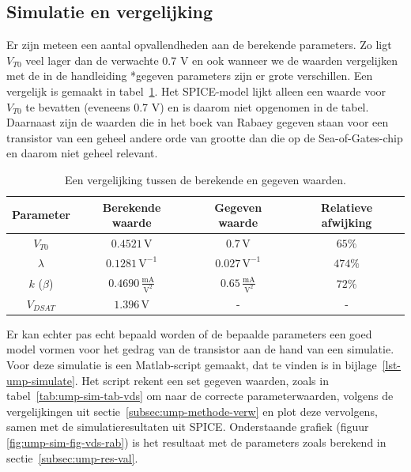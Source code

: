 \documentclass{scrartcl}
\begin{document}
\subsection{Simulatie en vergelijking}
\label{sec:ump-res-verg}
Er zijn meteen een aantal opvallendheden aan de berekende parameters. Zo ligt $V_{T0}$ veel lager dan de verwachte 0.7 V en ook wanneer we de waarden vergelijken met de in de handleiding *gegeven parameters zijn er grote verschillen. Een vergelijk is gemaakt in tabel~\ref{tab:ump-par-comp}. Het SPICE-model lijkt alleen een waarde voor $V_{T0}$ te bevatten (eveneens 0.7 V) en is daarom niet opgenomen in de tabel. Daarnaast zijn de waarden die in het boek van Rabaey gegeven staan voor een transistor van een geheel andere orde van grootte dan die op de Sea-of-Gates-chip en daarom niet geheel relevant. \cite[103]{rabaey-integrated-circuits}

\begin{table}[H]
	\centering
	\caption{Een vergelijking tussen de berekende en gegeven waarden. \cite[98]{epo3-manual}}
	\label{tab:ump-par-comp}
	\begin{tabular}{|c|c|c|c|} 	
		\hline
		Parameter & Berekende waarde & Gegeven waarde & Relatieve afwijking \\
		\hline
		$V_{T0}$ & $0.4521 \,\textrm{V}$ & $0.7 \,\textrm{V}$ & $65\%$ \\
		\hline
		$\lambda$ & $0.1281 \,\textrm{V}^{-1}$ & $0.027 \,\textrm{V}^{-1}$ & $474\%$ \\
		\hline
		$k$ ($\beta$) & $0.4690 \,\frac{\textrm{mA}}{\textrm{V}^{2}}$ & $0.65 \,\frac{\textrm{mA}}{\textrm{V}^{2}}$ & $72\%$ \\
		\hline
		$V_{DSAT}$ & $1.396 \, \textrm{V}$ & - & - \\
		\hline	
	\end{tabular}
\end{table}

Er kan echter pas echt bepaald worden of de bepaalde parameters een goed model vormen voor het gedrag van de transistor aan de hand van een simulatie. Voor deze simulatie is een Matlab-script gemaakt, dat te vinden is in bijlage~\ref{lst-ump-simulate}. Het script rekent een set gegeven waarden, zoals in tabel~\ref{tab:ump-sim-tab-vds} om naar de correcte parameterwaarden, volgens de vergelijkingen uit sectie~\ref{subsec:ump-methode-verw} en plot deze vervolgens, samen met de simulatieresultaten uit SPICE. Onderstaande grafiek (figuur \ref{fig:ump-sim-fig-vds-rab}) is het resultaat met de parameters zoals berekend in sectie~\ref{subsec:ump-res-val}.
\end{document}
